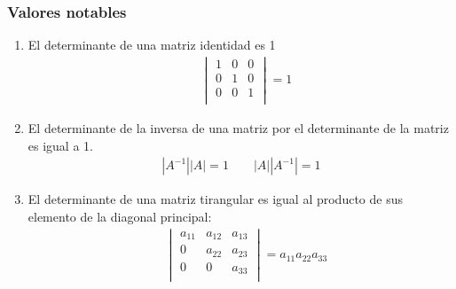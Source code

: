 \subsubsection*{Valores notables}
\begin{enumerate}
	\item El determinante de una matriz identidad es 1
	\begin{align*}
		&\begin{vmatrix}
			1&0&0\\
			0&1&0\\
			0&0&1\\
		\end{vmatrix}=1
	\end{align*}
	\item El determinante de la inversa de una matriz por el determinante de la matriz es igual a 1.
	\begin{align*}
		|A^{-1}||A|=1 \quad\quad |A||A^{-1}|=1
	\end{align*}
	\item El determinante de una matriz tirangular es igual al producto de sus elemento de la diagonal principal:
	\begin{align*}
		&\begin{vmatrix}
			a_{11}&a_{12}&a_{13}\\
			0&a_{22}&a_{23}\\
			0&0&a_{33}\\
		\end{vmatrix}=a_{11}a_{22}a_{33}
	\end{align*}
\end{enumerate}
